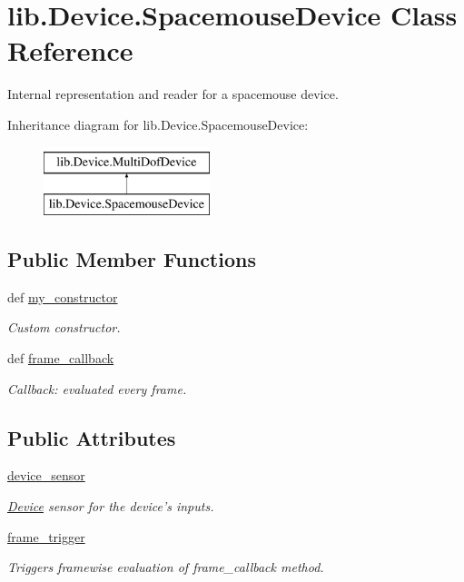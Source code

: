 \hypertarget{classlib_1_1Device_1_1SpacemouseDevice}{\section{lib.\-Device.\-Spacemouse\-Device \-Class \-Reference}
\label{classlib_1_1Device_1_1SpacemouseDevice}
}


\-Internal representation and reader for a spacemouse device.  


\-Inheritance diagram for lib.\-Device.\-Spacemouse\-Device\-:\begin{figure}[H]
\begin{center}
\leavevmode
\includegraphics[height=2.000000cm]{classlib_1_1Device_1_1SpacemouseDevice}
\end{center}
\end{figure}
\subsection*{\-Public \-Member \-Functions}
\begin{DoxyCompactItemize}
\item 
def \hyperlink{classlib_1_1Device_1_1SpacemouseDevice_adb5d0eba370e2e029806d614d15f1fbc}{my\-\_\-constructor}
\begin{DoxyCompactList}\small\item\em \-Custom constructor. \end{DoxyCompactList}\item 
def \hyperlink{classlib_1_1Device_1_1SpacemouseDevice_ad12e5e9f492da9511e3a345f0bd06602}{frame\-\_\-callback}
\begin{DoxyCompactList}\small\item\em \-Callback\-: evaluated every frame. \end{DoxyCompactList}\end{DoxyCompactItemize}
\subsection*{\-Public \-Attributes}
\begin{DoxyCompactItemize}
\item 
\hyperlink{classlib_1_1Device_1_1SpacemouseDevice_a656cf95658a15cbaa2af23e64d9c4a2a}{device\-\_\-sensor}
\begin{DoxyCompactList}\small\item\em \hyperlink{namespacelib_1_1Device}{\-Device} sensor for the device's inputs. \end{DoxyCompactList}\item 
\hyperlink{classlib_1_1Device_1_1SpacemouseDevice_ab46265643c45bac2d781eb05e13e2d34}{frame\-\_\-trigger}
\begin{DoxyCompactList}\small\item\em \-Triggers framewise evaluation of frame\-\_\-callback method. \end{DoxyCompactList}\end{DoxyCompactItemize}
